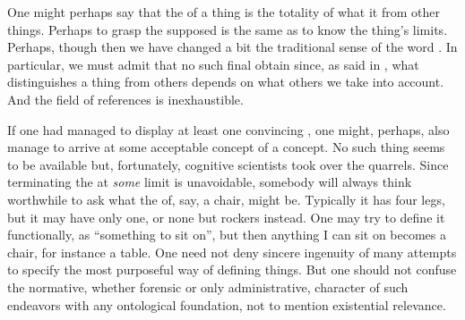 
\pa
One might perhaps say that the  of a thing is the totality of what 
 it from other things. 
Perhaps to grasp the supposed  is the same as
to know the thing's limits.
Perhaps, though then we have changed a bit the traditional sense of the word
. In particular, we must 
admit that no such final  obtain since, as said in 
, what distinguishes a thing from others 
depends on what others we take into account. And the field of references 
is inexhaustible.

If one had managed to display at least one convincing , one might,
perhaps, also manage to arrive at some acceptable concept of a concept. No such
thing seems to be available but, fortunately, cognitive scientists took over the
quarrels. Since terminating the  at {\em some} limit is
unavoidable, somebody will always think worthwhile to ask what the 
of, say, a chair, might be. Typically it has four legs, but it may have only
one, or none but rockers instead. One may try to define it functionally, as
``something to sit on'', but then anything I can sit on becomes a chair, for
instance a table. One need not deny sincere ingenuity of many attempts to
specify the most purposeful way of defining things. But one should not confuse
the normative, whether forensic or only administrative, character of such
endeavors with any ontological foundation, not to mention existential relevance.

